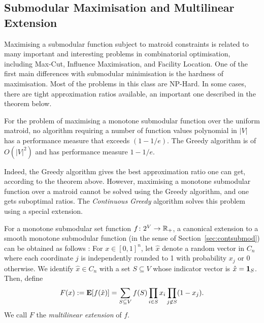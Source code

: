 \subsection{Submodular Maximisation and Multilinear Extension}
Maximising a submodular function subject to matroid constraints is related to many important and interesting problems in combinatorial optimisation, including Max-Cut, Influence Maximisation, and Facility Location. One of the first main differences with submodular minimisation is the hardness of maximisation. Most of the problems in this class are NP-Hard. In some cases, there are tight approximation ratios available, an important one described in the theorem below.

\begin{theorem}\label{thm:hardnesssubmod}
    For the problem of maximising a monotone submodular function over the uniform matroid, no algorithm requiring a number of function values polynomial in $|V|$ has a performance measure that exceeds $(1-1/e)$. The Greedy algorithm is of $O(|V|^2)$ and has performance measure $1-1/e$.
\end{theorem}
Indeed, the Greedy algorithm gives the best approximation ratio one can get, according to the theorem above. However, maximising a monotone submodular function over a matroid cannot be solved using the Greedy algorithm, and one gets suboptimal ratios. The \emph{Continuous Greedy} algorithm \citep{Calinescu2011} solves this problem using a special extension.

For a monotone submodular set function $f\colon 2^V \to \mathbb{R}_+$, a canonical extension to a smooth monotone submodular function (in the sense of Section~\ref{sec:contsubmod}) can be obtained as follows \citep{Calinescu2011}: For $x \in [0, 1]^n$, let $\hat{x}$ denote a random vector in $C_n$ where each coordinate $j$ is independently rounded to 1 with probability $x_j$ or 0 otherwise. We identify $\hat{x} \in C_n$ with a set $S \subseteq V$ whose indicator vector is $\hat{x} = \mathbf{1}_S$. Then, define
\[
    F(x) := \mathbf{E}[f(\hat{x})] = \sum_{S\subseteq V} f(S)\prod_{i\in S} x_i \prod_{j\not\in S}(1-x_j).
\]
We call $F$ the \emph{multilinear extension} of $f$.


